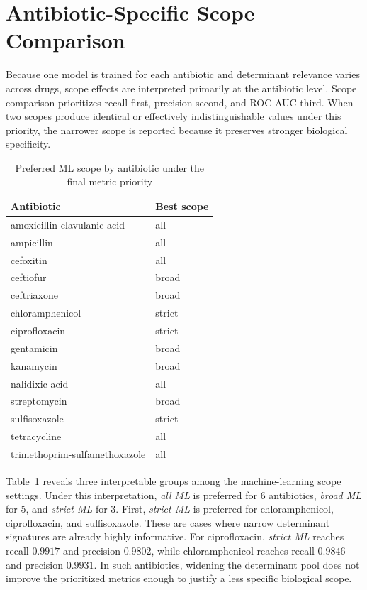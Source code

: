 \section{Antibiotic-Specific Scope Comparison}

Because one model is trained for each antibiotic and determinant relevance varies across drugs, scope effects are interpreted primarily at the antibiotic level. Scope comparison prioritizes recall first, precision second, and ROC-AUC third. When two scopes produce identical or effectively indistinguishable values under this priority, the narrower scope is reported because it preserves stronger biological specificity.

\begin{table}[H]
\centering
\caption{Preferred ML scope by antibiotic under the final metric priority}
\label{tab:best-scope-by-antibiotic}
\small
\begin{tabular}{ll}
\toprule
Antibiotic & Best scope \\
\midrule
amoxicillin-clavulanic acid & all \\
ampicillin & all \\
cefoxitin & all \\
ceftiofur & broad \\
ceftriaxone & broad \\
chloramphenicol & strict \\
ciprofloxacin & strict \\
gentamicin & broad \\
kanamycin & broad \\
nalidixic acid & all \\
streptomycin & broad \\
sulfisoxazole & strict \\
tetracycline & all \\
trimethoprim-sulfamethoxazole & all \\
\bottomrule
\end{tabular}
\end{table}

Table~\ref{tab:best-scope-by-antibiotic} reveals three interpretable groups among the machine-learning scope settings. Under this interpretation, \textit{all ML} is preferred for 6 antibiotics, \textit{broad ML} for 5, and \textit{strict ML} for 3. First, \textit{strict ML} is preferred for chloramphenicol, ciprofloxacin, and sulfisoxazole. These are cases where narrow determinant signatures are already highly informative. For ciprofloxacin, \textit{strict ML} reaches recall \(0.9917\) and precision \(0.9802\), while chloramphenicol reaches recall \(0.9846\) and precision \(0.9931\). In such antibiotics, widening the determinant pool does not improve the prioritized metrics enough to justify a less specific biological scope.

